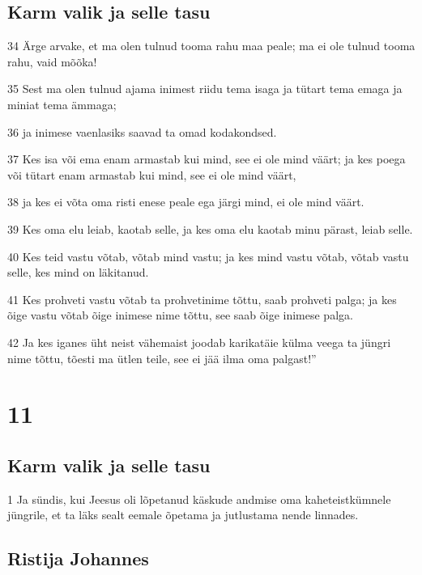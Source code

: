 \section*{Karm valik ja selle tasu}

\par 34 Ärge arvake, et ma olen tulnud tooma rahu maa peale; ma ei ole tulnud tooma rahu, vaid mõõka!
\par 35 Sest ma olen tulnud ajama inimest riidu tema isaga ja tütart tema emaga ja miniat tema ämmaga;
\par 36 ja inimese vaenlasiks saavad ta omad kodakondsed.
\par 37 Kes isa või ema enam armastab kui mind, see ei ole mind väärt; ja kes poega või tütart enam armastab kui mind, see ei ole mind väärt,
\par 38 ja kes ei võta oma risti enese peale ega järgi mind, ei ole mind väärt.
\par 39 Kes oma elu leiab, kaotab selle, ja kes oma elu kaotab minu pärast, leiab selle.
\par 40 Kes teid vastu võtab, võtab mind vastu; ja kes mind vastu võtab, võtab vastu selle, kes mind on läkitanud.
\par 41 Kes prohveti vastu võtab ta prohvetinime tõttu, saab prohveti palga; ja kes õige vastu võtab õige inimese nime tõttu, see saab õige inimese palga.
\par 42 Ja kes iganes üht neist vähemaist joodab karikatäie külma veega ta jüngri nime tõttu, tõesti ma ütlen teile, see ei jää ilma oma palgast!”


\chapter{11}

\section*{Karm valik ja selle tasu}

\par 1 Ja sündis, kui Jeesus oli lõpetanud käskude andmise oma kaheteistkümnele jüngrile, et ta läks sealt eemale õpetama ja jutlustama nende linnades.

\section*{Ristija Johannes}

